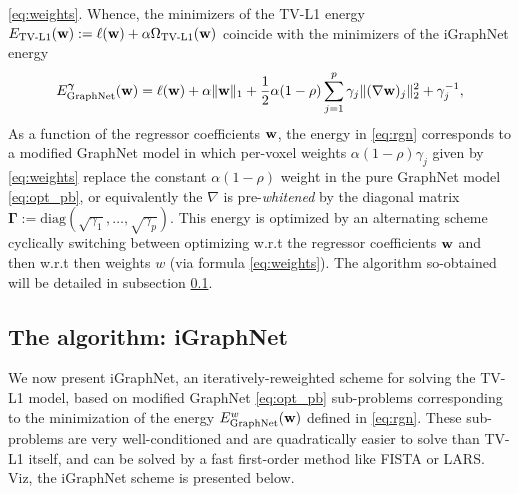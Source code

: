 \eqref{eq:weights}. Whence, the minimizers of the TV-L1 energy
$E_{\text{TV-L1}}(\mathbf{w}) := \ell(\mathbf{w}) + \alpha \Omega_{\text{TV-L1}}(\mathbf{w})$ coincide with the minimizers of
the iGraphNet energy
\begin{equation}
\begin{split}
E_{\text{GraphNet}}^{\boldsymbol{\gamma}}(\mathbf{w}) = \ell(\mathbf{w}) +
\alpha \|\mathbf{w}\|_1+ \frac{1}{2}\alpha (1 - \rho)
\sum_{j=1}^p \gamma_j\|(\nabla \mathbf{w})_j\|_2^2
+ \gamma_j^{-1},
\end{split}
\label{eq:rgn}
\end{equation}
As a function of the regressor coefficients $\mathbf{w}$, the energy in
\eqref{eq:rgn} corresponds to a modified
GraphNet model in which per-voxel weights $\alpha(1 - \rho)\gamma_j$ given
by \eqref{eq:weights} replace the constant $\alpha(1 - \rho)$ weight
in the pure GraphNet model \eqref{eq:opt_pb}, or
equivalently the $\nabla$ is pre-\textit{whitened} by the diagonal
matrix $\boldsymbol{\Gamma} := \mathrm{diag}(\sqrt{\gamma_1},\ldots,\sqrt{\gamma_p})$. This energy
is optimized by an alternating scheme cyclically switching between
optimizing w.r.t the regressor coefficients $\mathbf{w}$ and then w.r.t
then weights $w$ (via formula \eqref{eq:weights}). The algorithm
so-obtained will be detailed in subsection \ref{sec:algo}.

\subsection{The algorithm: iGraphNet}
\label{sec:algo}
We now present iGraphNet, an iteratively-reweighted scheme for
solving the TV-L1 model, based on modified GraphNet \eqref{eq:opt_pb}
sub-problems corresponding to the minimization of the energy
$E_{\text{GraphNet}}^{w}(\mathbf{w})$ defined in
\eqref{eq:rgn}. These sub-problems  are very well-conditioned and are
quadratically easier to solve than TV-L1 itself, and can be solved by
a fast first-order method like FISTA or LARS. Viz, the iGraphNet
scheme is presented below.

